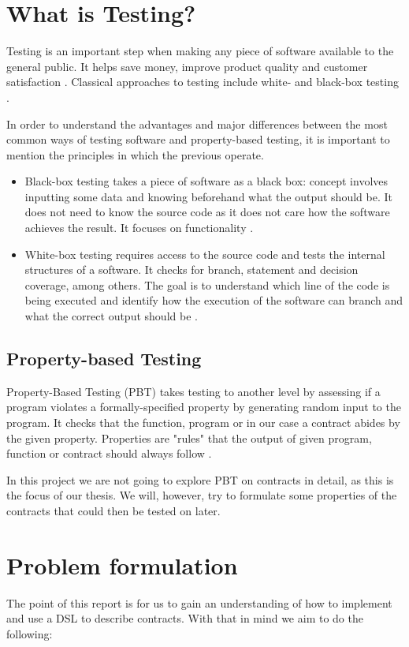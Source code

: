 \documentclass{ituthesis}
\begin{document}
\section{What is Testing?} %
Testing is an important step when making any piece of software available to the general public. It helps save money, improve product quality and customer satisfaction \cite{4reasonstesting}.
Classical approaches to testing include white- and black-box testing \cite{testing}.

In order to understand the advantages and major differences between the most common ways of testing software and property-based testing, it is important to mention the principles in which the previous operate.
\begin{itemize}
    \item Black-box testing takes a piece of software as a black box: concept involves inputting some data and knowing beforehand what the output should be. It does not need to know the source code as it does not care how the software achieves the result. It focuses on functionality \cite{testing}.
    \item White-box testing requires access to the source code and tests the internal structures of a software. It checks for branch, statement and decision coverage, among others. The goal is to understand which line of the code is being executed and identify how the execution of the software can branch and what the correct output should be \cite{williams2006white}.
\end{itemize}

\subsection{Property-based Testing} %
Property-Based Testing (PBT) takes testing to another level by assessing if a program violates a formally-specified property by generating random input to the program. It checks that the function, program or in our case a contract abides by the given property. Properties are "rules" that the output of given program, function or contract should always follow \cite{fink1994towards}.

In this project we are not going to explore PBT on contracts in detail, as this is the focus of our thesis. We will, however, try to formulate some properties of the contracts that could then be tested on later.

\section{Problem formulation} %
The point of this report is for us to gain an understanding of how to implement and use a DSL to describe contracts. With that in mind we aim to do the following:
\end{document}
